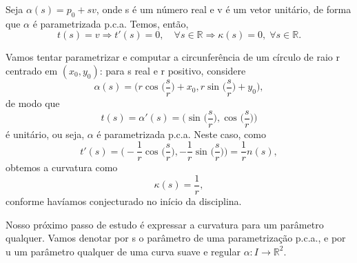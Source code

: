 \documentclass[../differential_geometry.tex]{subfiles}
\begin{document}
\begin{example}[Reta]
	Seja \(\alpha (s) = p_{0}+sv\), onde s é um número real e v é um vetor unitário, de forma que \(\alpha \) é parametrizada p.c.a. Temos, então,
	\[
		t(s) = v \Rightarrow t'(s) =0, \quad \forall s\in \mathbb{R} \Rightarrow \kappa (s) = 0, \; \forall s\in \mathbb{R}.
	\]
\end{example}
\begin{example}[Círculo]
	Vamos tentar parametrizar e computar a circunferência de um círculo de raio r centrado em \((x_{0}, y_{0})\): para s real e r positivo, considere
	\[
		\alpha (s) = \biggl(r \cos^{}{\biggl(\frac{s}{r}\biggr)}+x_{0}, r\sin^{}{\biggl(\frac{s}{r}\biggr)}+y_{0}\biggr),
	\]
	de modo que
	\[
		t(s)=\alpha '(s) = \biggl(\sin^{}{\biggl(\frac{s}{r}\biggr)}, \cos^{}{\biggl(\frac{s}{r}\biggr)}\biggr)
	\]
	é unitário, ou seja, \(\alpha \) é parametrizada p.c.a. Neste caso, como
	\[
		t'(s)=\biggl(-\frac{1}{r} \cos^{}{\biggl(\frac{s}{r}\biggr)}, -\frac{1}{r}\sin^{}{\biggl(\frac{s}{r}\biggr)}\biggr) = \frac{1}{r}n(s),
	\]
	obtemos a curvatura como
	\[
		\kappa (s) = \frac{1}{r},
	\]
	conforme havíamos conjecturado no início da disciplina.
\end{example}

Nosso próximo passo de estudo é expressar a curvatura para um parâmetro qualquer.  Vamos denotar por s o parâmetro de uma parametrização p.c.a., e por u um parâmetro qualquer de uma curva suave e regular \(\alpha :I\rightarrow \mathbb{R}^{2}\).
\end{document}
